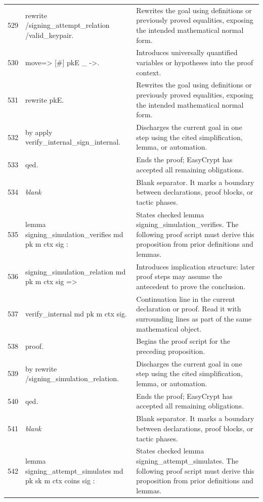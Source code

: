 \documentclass[10pt]{article}
\begin{document}
\begin{longtable}{r L{0.53\textwidth} L{0.37\textwidth}}
529 & {\ttfamily\scriptsize rewrite /signing\_attempt\_relation /valid\_keypair.} & Rewrites the goal using definitions or previously proved equalities, exposing the intended mathematical normal form. \\
530 & {\ttfamily\scriptsize move=> [\#] pkE \_ ->.} & Introduces universally quantified variables or hypotheses into the proof context. \\
531 & {\ttfamily\scriptsize rewrite pkE.} & Rewrites the goal using definitions or previously proved equalities, exposing the intended mathematical normal form. \\
532 & {\ttfamily\scriptsize by apply verify\_internal\_sign\_internal.} & Discharges the current goal in one step using the cited simplification, lemma, or automation. \\
533 & {\ttfamily\scriptsize qed.} & Ends the proof; EasyCrypt has accepted all remaining obligations. \\
534 & {\ttfamily\scriptsize \emph{blank}} & Blank separator.  It marks a boundary between declarations, proof blocks, or tactic phases. \\
535 & {\ttfamily\scriptsize lemma signing\_simulation\_verifies md pk m ctx sig :} & States checked lemma signing\_simulation\_verifies.  The following proof script must derive this proposition from prior definitions and lemmas. \\
536 & {\ttfamily\scriptsize   signing\_simulation\_relation md pk m ctx sig =>} & Introduces implication structure: later proof steps may assume the antecedent to prove the conclusion. \\
537 & {\ttfamily\scriptsize   verify\_internal md pk m ctx sig.} & Continuation line in the current declaration or proof.  Read it with surrounding lines as part of the same mathematical object. \\
538 & {\ttfamily\scriptsize proof.} & Begins the proof script for the preceding proposition. \\
539 & {\ttfamily\scriptsize by rewrite /signing\_simulation\_relation.} & Discharges the current goal in one step using the cited simplification, lemma, or automation. \\
540 & {\ttfamily\scriptsize qed.} & Ends the proof; EasyCrypt has accepted all remaining obligations. \\
541 & {\ttfamily\scriptsize \emph{blank}} & Blank separator.  It marks a boundary between declarations, proof blocks, or tactic phases. \\
542 & {\ttfamily\scriptsize lemma signing\_attempt\_simulates md pk sk m ctx coins sig :} & States checked lemma signing\_attempt\_simulates.  The following proof script must derive this proposition from prior definitions and lemmas. \\

\end{longtable}
\end{document}
